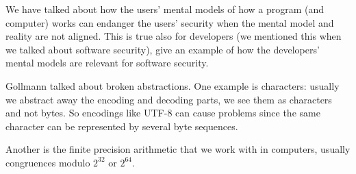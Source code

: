 \question[3]\label{q:software}
We have talked about how the users' mental models of how a program (and 
computer) works can endanger the users' security when the mental model and 
reality are not aligned.
This is true also for developers (we mentioned this when we talked about 
software security), give an example of how the developers' mental models are 
relevant for software security.

\begin{solution}
  Gollmann talked about broken abstractions.
  One example is characters: usually we abstract away the encoding and decoding 
  parts, we see them as characters and not bytes.
  So encodings like UTF-8 can cause problems since the same character can be 
  represented by several byte sequences.

  Another is the finite precision arithmetic that we work with in computers, 
  usually congruences modulo \(2^{32}\) or \(2^{64}\).
\end{solution}

